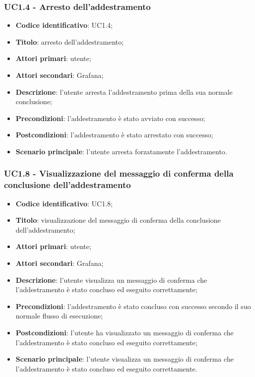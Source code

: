\subsubsection{UC1.4 - Arresto dell'addestramento}
\begin{itemize}
	\item \textbf{Codice identificativo}: UC1.4;
	\item \textbf{Titolo}: arresto dell'addestramento;
	\item \textbf{Attori primari}: utente;
	\item \textbf{Attori secondari}: Grafana\glo;
	\item \textbf{Descrizione}: l'utente arresta l'addestramento prima della sua normale conclusione;
	\item \textbf{Precondizioni}: l'addestramento è stato avviato con successo;
	\item \textbf{Postcondizioni}: l'addestramento è stato arrestato con successo;
	\item \textbf{Scenario principale}: l'utente arresta forzatamente l'addestramento.
\end{itemize}

\subsubsection{UC1.8 - Visualizzazione del messaggio di conferma della conclusione dell'addestramento}
\begin{itemize}
	\item \textbf{Codice identificativo}: UC1.8;
	\item \textbf{Titolo}: visualizzazione del messaggio di conferma della conclusione dell'addestramento;
	\item \textbf{Attori primari}: utente;
	\item \textbf{Attori secondari}: Grafana\glo;
	\item \textbf{Descrizione}: l'utente visualizza un messaggio di conferma che l'addestramento è stato concluso ed eseguito correttamente;
	\item \textbf{Precondizioni}: l'addestramento è stato concluso con successo secondo il suo normale flusso di esecuzione;
	\item \textbf{Postcondizioni}: l'utente ha visualizzato un messaggio di conferma che l'addestramento è stato concluso ed eseguito correttamente;
	\item \textbf{Scenario principale}: l'utente visualizza un messaggio di conferma che l'addestramento è stato concluso ed eseguito correttamente.
\end{itemize}
